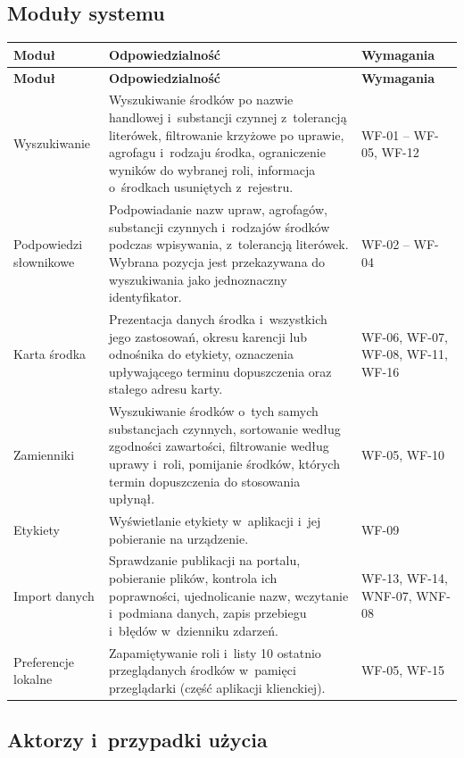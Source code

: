 \subsection{Moduły systemu}

\begingroup
\small
\begin{longtable}{|>{\raggedright\arraybackslash}p{3cm}|p{9.4cm}|>{\raggedright\arraybackslash}p{2.2cm}|}
\hline
\textbf{Moduł} & \textbf{Odpowiedzialność} & \textbf{Wymagania} \\
\hline
\endfirsthead
\hline
\textbf{Moduł} & \textbf{Odpowiedzialność} & \textbf{Wymagania} \\
\hline
\endhead
Wyszukiwanie &
Wyszukiwanie środków po nazwie handlowej i~substancji czynnej z~tolerancją
literówek, filtrowanie krzyżowe po uprawie, agrofagu i~rodzaju środka,
ograniczenie wyników do wybranej roli, informacja o~środkach usuniętych
z~rejestru. &
WF-01 -- WF-05, WF-12 \\
\hline
Podpowiedzi słownikowe &
Podpowiadanie nazw upraw, agrofagów, substancji czynnych i~rodzajów środków
podczas wpisywania, z~tolerancją literówek. Wybrana pozycja jest przekazywana
do wyszukiwania jako jednoznaczny identyfikator. &
WF-02 -- WF-04 \\
\hline
Karta środka &
Prezentacja danych środka i~wszystkich jego zastosowań, okresu karencji lub
odnośnika do etykiety, oznaczenia upływającego terminu dopuszczenia oraz
stałego adresu karty. &
WF-06, WF-07, WF-08, WF-11, WF-16 \\
\hline
Zamienniki &
Wyszukiwanie środków o~tych samych substancjach czynnych, sortowanie według
zgodności zawartości, filtrowanie według uprawy i~roli, pomijanie środków,
których termin dopuszczenia do stosowania upłynął. &
WF-05, WF-10 \\
\hline
Etykiety &
Wyświetlanie etykiety w~aplikacji i~jej pobieranie na urządzenie. &
WF-09 \\
\hline
Import danych &
Sprawdzanie publikacji na portalu, pobieranie plików, kontrola ich
poprawności, ujednolicanie nazw, wczytanie i~podmiana danych, zapis
przebiegu i~błędów w~dzienniku zdarzeń. &
WF-13, WF-14, WNF-07, WNF-08 \\
\hline
Preferencje lokalne &
Zapamiętywanie roli i~listy 10 ostatnio przeglądanych środków w~pamięci
przeglądarki (część aplikacji klienckiej). &
WF-05, WF-15 \\
\hline
\end{longtable}
\endgroup

\subsection{Aktorzy i~przypadki użycia}

